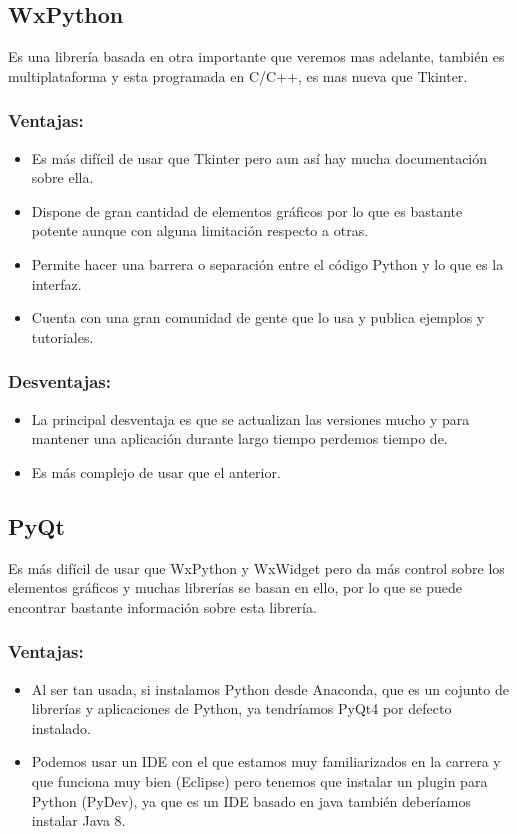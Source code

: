 \subsection{WxPython}
Es una librería basada en otra importante que veremos mas adelante, también es multiplataforma y esta programada en C/C++, es mas nueva que Tkinter.
\subsubsection{Ventajas:}
\begin{itemize}
\item Es más difícil de usar que Tkinter pero aun así hay mucha documentación sobre ella.

\item Dispone de gran cantidad de elementos gráficos por lo que es bastante potente aunque con alguna limitación respecto a otras.

\item Permite hacer una barrera o separación entre el código Python y lo que es la interfaz.
\item Cuenta con una gran comunidad de gente que lo usa y publica ejemplos y tutoriales.
\end{itemize}

\subsubsection{Desventajas:}
\begin{itemize}
\item La principal desventaja es que se actualizan las versiones mucho y para mantener una aplicación durante largo tiempo perdemos tiempo de.
\item Es más complejo de usar que el anterior.
\end{itemize}

\subsection{PyQt}
Es más difícil de usar que WxPython y WxWidget pero da más control sobre los elementos gráficos y muchas librerías se basan en ello, por lo que se puede encontrar bastante información sobre esta librería.


\subsubsection{Ventajas:}

\begin{itemize}
\item Al ser tan usada, si instalamos Python desde Anaconda, que es un cojunto de librerías y aplicaciones de Python, ya tendríamos PyQt4 por defecto instalado.

\item Podemos usar un IDE con el que estamos muy familiarizados en la carrera y que funciona muy bien (Eclipse) pero tenemos que instalar un plugin para Python (PyDev), ya que es un IDE basado en java también deberíamos instalar Java 8.
\end{itemize}

